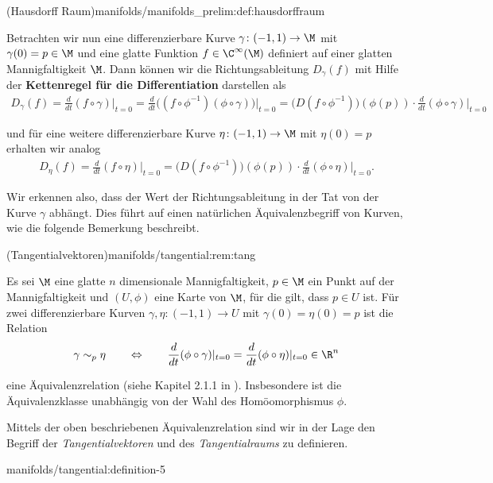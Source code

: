 \documentclass[letterpaper,10pt,english]{jupyterBook}
\begin{document}
\begin{definition}{(Hausdorff Raum)}{manifolds/manifolds_prelim:def:hausdorffraum}
\par
Betrachten wir nun eine differenzierbare Kurve \(\gamma \colon (-1, 1) \rightarrow \M\) mit \(\gamma(0)=p \in \M\) und eine glatte Funktion \(f \in \C^\infty(\M)\) definiert auf einer glatten Mannigfaltigkeit \(\M\).
Dann können wir die Richtungsableitung \(D_\gamma(f)\) mit Hilfe der \textbf{Kettenregel für die Differentiation} darstellen als
\begin{align*}
D_\gamma(f) = \frac{d}{dt}(f\circ \gamma)\big\rvert_{t=0} = \frac{d}{dt}\big( (f\circ \phi^{-1}) (\phi \circ \gamma) \big)\rvert_{t=0} = 
\big(D(f\circ \phi^{-1})\big)(\phi(p))\cdot \frac{d}{dt}(\phi \circ \gamma)\rvert_{t=0}
\end{align*}
\par
und für eine weitere differenzierbare Kurve \(\eta \colon (-1, 1) \rightarrow \M\) mit \(\eta(0)=p\) erhalten wir analog
\begin{align*}
D_\eta(f) = \frac{d}{dt}(f\circ \eta)\big\rvert_{t=0} = 
\big(D(f\circ \phi^{-1})\big)(\phi(p))\cdot \frac{d}{dt}(\phi \circ \eta)\rvert_{t=0}.
\end{align*}
\par
Wir erkennen also, dass der Wert der Richtungsableitung in der Tat von der Kurve \(\gamma\) abhängt.
Dies führt auf einen natürlichen Äquivalenzbegriff von Kurven, wie die folgende Bemerkung beschreibt.
\begin{remark}{(Tangentialvektoren)}{manifolds/tangential:rem:tang}



\par
Es sei \(\M\) eine glatte \(n\) dimensionale Mannigfaltigkeit, \(p\in\M\) ein Punkt auf der Mannigfaltigkeit und \((U,\phi)\) eine Karte von \(\M\), für die gilt, dass \(p\in U\) ist.
Für zwei differenzierbare Kurven \(\gamma, \eta:(-1,1) \to U\) mit \(\gamma(0) = \eta(0) = p\) ist die Relation
\begin{align*}
\gamma \sim_p \eta
\qquad \Leftrightarrow \qquad
\frac{d}{dt}(\phi \circ \gamma)\rvert_{t=0} = \frac{d}{dt}(\phi \circ \eta)\rvert_{t=0}\in \R^n
\end{align*}
\par
eine Äquivalenzrelation (siehe Kapitel 2.1.1 in \cite{Bur20}).
Insbesondere ist die Äquivalenzklasse unabhängig von der Wahl des Homöomorphismus \(\phi\).
\end{remark}

\par
Mittels der oben beschriebenen Äquivalenzrelation sind wir in der Lage den Begriff der \emph{Tangentialvektoren} und des \emph{Tangentialraums} zu definieren.
\begin{definition}{}{manifolds/tangential:definition-5}




\end{definition}
\end{definition}
\end{document}
